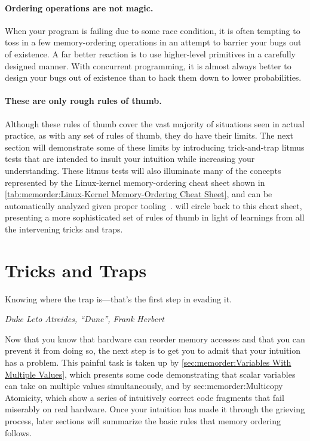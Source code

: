 \paragraph{Ordering operations are not magic.}
When your program is failing due to some race condition, it is often
tempting to toss in a few memory-ordering operations in an attempt
to barrier your bugs out of existence.
A far better reaction is to use higher-level primitives in a carefully
designed manner.
With concurrent programming, it is almost always better to design your
bugs out of existence than to hack them down to lower probabilities.

\paragraph{These are only rough rules of thumb.}
Although these rules of thumb cover the vast majority of situations
seen in actual practice, as with any set of rules of thumb, they
do have their limits.
The next section will demonstrate some of these limits by introducing
trick-and-trap litmus tests that are intended to insult your
intuition while increasing your understanding.
These litmus tests will also illuminate many of the concepts
represented by the Linux-kernel memory-ordering cheat sheet shown in
\cref{tab:memorder:Linux-Kernel Memory-Ordering Cheat Sheet},
and can be automatically analyzed given proper
tooling~\cite{Alglave:2018:FSC:3173162.3177156}.
 will
circle back to this cheat sheet, presenting a more sophisticated set of
rules of thumb in light of learnings from all the intervening tricks
and traps.

\QuickQuizEnd

\section{Tricks and Traps}
\label{sec:memorder:Tricks and Traps}
%
\epigraph{Knowing where the trap is---that's the first step in evading it.}
	 {\emph{Duke Leto Atreides, ``Dune'', Frank Herbert}}

Now that you know that hardware can reorder memory accesses and that you
can prevent it from doing so, the next step is to get you to admit
that your intuition has a problem.
This painful task is taken up by
\cref{sec:memorder:Variables With Multiple Values},
which presents some code demonstrating that scalar variables can
take on multiple values simultaneously,
and by
{sec:memorder:Multicopy Atomicity},
which show a series of intuitively correct code fragments that fail miserably
on real hardware.
Once your intuition has made it through the grieving process, later
sections will summarize the basic rules that memory ordering follows.

